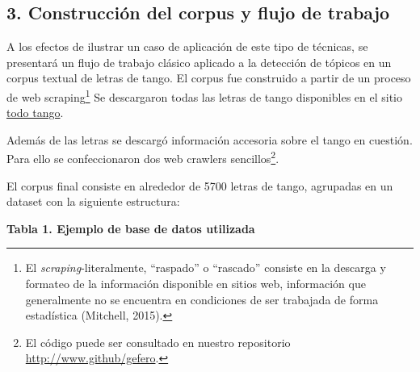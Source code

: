\documentclass[]{article}
\let\rmarkdownfootnote\footnote%
\def\footnote{\protect\rmarkdownfootnote}
\begin{document}
\subsection{3. Construcción del corpus y flujo de
trabajo}\label{construcciuxf3n-del-corpus-y-flujo-de-trabajo}

A los efectos de ilustrar un caso de aplicación de este tipo de
técnicas, se presentará un flujo de trabajo clásico aplicado a la
detección de tópicos en un corpus textual de letras de tango. El corpus
fue construido a partir de un proceso de web scraping\footnote{El
  \emph{scraping}-literalmente, ``raspado'' o ``rascado'' consiste en la
  descarga y formateo de la información disponible en sitios web,
  información que generalmente no se encuentra en condiciones de ser
  trabajada de forma estadística (Mitchell, 2015).} Se descargaron todas
las letras de tango disponibles en el sitio
\href{www.todotango.com}{todo tango}.

Además de las letras se descargó información accesoria sobre el tango en
cuestión. Para ello se confeccionaron dos web crawlers
sencillos\footnote{El código puede ser consultado en nuestro repositorio
  \url{http://www.github/gefero}.}.

El corpus final consiste en alrededor de 5700 letras de tango, agrupadas
en un dataset con la siguiente estructura:

\textbf{Tabla 1. Ejemplo de base de datos utilizada}
\end{document}

